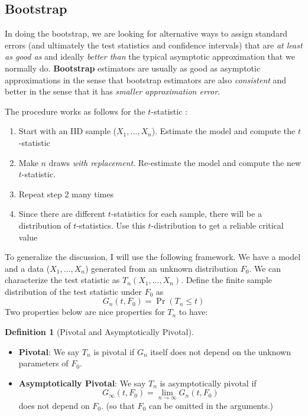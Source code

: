 \documentclass[12pt]{article}
\theoremstyle{definition}
\newtheorem{definition}{Definition}[section]
\theoremstyle{property}
\theoremstyle{assumption}
\theoremstyle{example}
\theoremstyle{comment}
\begin{document}
\subsection{Bootstrap}
In doing the bootstrap, we are looking for alternative ways to assign standard errors (and ultimately the test statistics and confidence intervals) that are \textit{at least as good as} and ideally \textit{better than} the typical asymptotic approximation that we normally do. \textbf{Bootstrap} estimators are usually as good as asymptotic approximations in the sense that bootstrap estimators are also \textit{consistent} and better in the sense that it has \textit{smaller approximation error}. \par
The procedure works as follows for the $t$-statistic : 
\begin{enumerate}
\item Start with an IID sample ($X_1,...,X_n$). Estimate the model and compute the $t$-statistic
\item Make $n$ draws \textit{with replacement}. Re-estimate the model and compute the new $t$-statistic.
\item Repeat step 2 many times
\item Since there are different $t$-statistics for each sample, there will be a distribution of $t$-statistics. Use this $t$-distribution to get a reliable critical value
\end{enumerate}\par
To generalize the discussion, I will use the following framework. We have a model and a data ($X_1,...,X_n$) generated from an unknown distribution $F_0$. We can characterize the test statistic as $T_n(X_1,...,X_n)$. Define the finite sample distribution of the test statistic under $F_0$ as
\[
G_n(t,F_0) = \Pr(T_n\leq t)
\]
Two properties below are nice properties for $T_n$ to have:
\begin{mdframed}[backgroundcolor=blue!5] 
\begin{definition}[Pivotal and Asymptotically Pivotal]  \ \\
\begin{itemize}
\item \textbf{Pivotal}: We say $T_n$ is pivotal if $G_n$ itself does not depend on the unknown parameters of $F_0$. 
\item \textbf{Asymptotically Pivotal}: We say $T_n$ is asymptotically pivotal if 
\[
G_\infty(t,F_0)=\lim_{n\to\infty}G_n(t,F_0)
\]
 does not depend on $F_0$. (so that $F_0$ can be omitted in the arguments.)
\end{itemize}
\end{definition}
\end{mdframed} 
\end{document}

